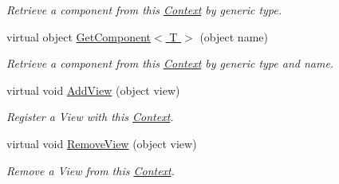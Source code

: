 \begin{DoxyCompactItemize}
\begin{DoxyCompactList}\small\item\em Retrieve a component from this \hyperlink{classstrange_1_1extensions_1_1context_1_1impl_1_1_context}{Context} by generic type. \end{DoxyCompactList}\item 
\hypertarget{classstrange_1_1extensions_1_1context_1_1impl_1_1_context_aa9a7d7c49d19ca3fca754431d0f111aa}{virtual object \hyperlink{classstrange_1_1extensions_1_1context_1_1impl_1_1_context_aa9a7d7c49d19ca3fca754431d0f111aa}{Get\-Component$<$ T $>$} (object name)}\label{classstrange_1_1extensions_1_1context_1_1impl_1_1_context_aa9a7d7c49d19ca3fca754431d0f111aa}

\begin{DoxyCompactList}\small\item\em Retrieve a component from this \hyperlink{classstrange_1_1extensions_1_1context_1_1impl_1_1_context}{Context} by generic type and name. \end{DoxyCompactList}\item 
\hypertarget{classstrange_1_1extensions_1_1context_1_1impl_1_1_context_aec01de93dabe196c1499bce945880d01}{virtual void \hyperlink{classstrange_1_1extensions_1_1context_1_1impl_1_1_context_aec01de93dabe196c1499bce945880d01}{Add\-View} (object view)}\label{classstrange_1_1extensions_1_1context_1_1impl_1_1_context_aec01de93dabe196c1499bce945880d01}

\begin{DoxyCompactList}\small\item\em Register a View with this \hyperlink{classstrange_1_1extensions_1_1context_1_1impl_1_1_context}{Context}. \end{DoxyCompactList}\item 
\hypertarget{classstrange_1_1extensions_1_1context_1_1impl_1_1_context_a027f31fe58bb8a179119bed5973a2e30}{virtual void \hyperlink{classstrange_1_1extensions_1_1context_1_1impl_1_1_context_a027f31fe58bb8a179119bed5973a2e30}{Remove\-View} (object view)}\label{classstrange_1_1extensions_1_1context_1_1impl_1_1_context_a027f31fe58bb8a179119bed5973a2e30}

\begin{DoxyCompactList}\small\item\em Remove a View from this \hyperlink{classstrange_1_1extensions_1_1context_1_1impl_1_1_context}{Context}. \end{DoxyCompactList}\end{DoxyCompactItemize}

